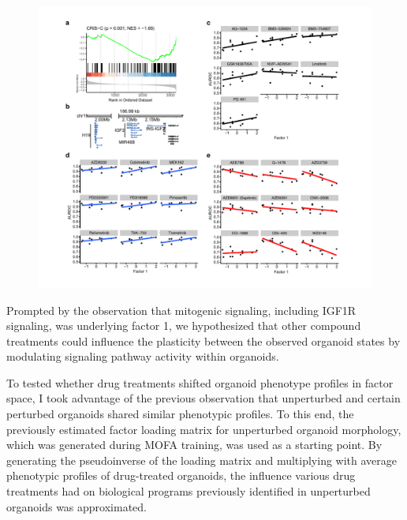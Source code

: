 \begin{flushleft}
\begin{figure}[h!]
\centering
\includegraphics[width=\textwidth,
                height=\textheight,
                keepaspectratio]{figures/promise/pdf/fig_6_2.pdf}
\caption{}
\label{fig_262}
\end{figure}

\bigbreak
Prompted by the observation that mitogenic signaling, including IGF1R signaling, was underlying factor 1, we hypothesized that other compound treatments could influence the plasticity between the observed organoid states by modulating signaling pathway activity within organoids. 

\bigbreak
To tested whether drug treatments shifted organoid phenotype profiles in factor space, I took advantage of the previous observation that unperturbed and certain perturbed organoids shared similar phenotypic profiles. To this end, the previously estimated factor loading matrix for unperturbed organoid morphology, which was generated during MOFA training, was used as a starting point. By generating the pseudoinverse of the loading matrix and multiplying with average phenotypic profiles of drug-treated organoids, the influence various drug treatments had on biological programs previously identified in unperturbed organoids was approximated. 


\end{flushleft}
